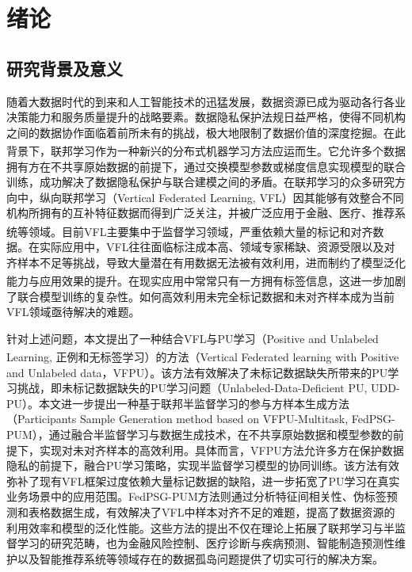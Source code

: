 \chapter{绪论} 
\thispagestyle{others} 
\pagestyle{others} 
\xiaosi 

\section{研究背景及意义}
随着大数据时代的到来和人工智能技术的迅猛发展，数据资源已成为驱动各行各业决策能力和服务质量提升的战略要素。数据隐私保护法规日益严格，使得不同机构之间的数据协作面临着前所未有的挑战，极大地限制了数据价值的深度挖掘。在此背景下，联邦学习\textsuperscript{\cite{chen2021secureboost+,de2010practical}}作为一种新兴的分布式机器学习方法应运而生。它允许多个数据拥有方在不共享原始数据的前提下，通过交换模型参数或梯度信息实现模型的联合训练，成功解决了数据隐私保护与联合建模之间的矛盾。在联邦学习的众多研究方向中，纵向联邦学习（Vertical Federated Learning, VFL）因其能够有效整合不同机构所拥有的互补特征数据而得到广泛关注，并被广泛应用于金融、医疗、推荐系统等领域\textsuperscript{\cite{liu2020secure,chen2020vafl}}。目前VFL主要集中于监督学习领域，严重依赖大量的标记和对齐数据。在实际应用中，VFL往往面临标注成本高、领域专家稀缺、资源受限以及对齐样本不足等挑战，导致大量潜在有用数据无法被有效利用，进而制约了模型泛化能力与应用效果的提升\textsuperscript{\cite{li2021comatch}}。在现实应用中常常只有一方拥有标签信息，这进一步加剧了联合模型训练的复杂性。如何高效利用未完全标记数据和未对齐样本成为当前VFL领域亟待解决的难题。

针对上述问题，本文提出了一种结合VFL与PU学习（Positive and Unlabeled Learning, 正例和无标签学习）\textsuperscript{\cite{pulearn}}的方法（Vertical Federated learning with Positive and Unlabeled data，VFPU）。该方法有效解决了未标记数据缺失所带来的PU学习挑战，即未标记数据缺失的PU学习问题（Unlabeled-Data-Deficient PU, UDD-PU）。本文进一步提出一种基于联邦半监督学习的参与方样本生成方法（Participants Sample Generation method based on VFPU-Multitask, FedPSG-PUM），通过融合半监督学习与数据生成技术，在不共享原始数据和模型参数的前提下，实现对未对齐样本的高效利用。具体而言，VFPU方法允许多方在保护数据隐私的前提下，融合PU学习策略，实现半监督学习模型的协同训练。该方法有效弥补了现有VFL框架过度依赖大量标记数据的缺陷，进一步拓宽了PU学习在真实业务场景中的应用范围。FedPSG-PUM方法则通过分析特征间相关性、伪标签预测和表格数据生成，有效解决了VFL中样本对齐不足的难题，提高了数据资源的利用效率和模型的泛化性能。这些方法的提出不仅在理论上拓展了联邦学习与半监督学习的研究范畴，也为金融风险控制、医疗诊断与疾病预测、智能制造预测性维护以及智能推荐系统等领域存在的数据孤岛问题提供了切实可行的解决方案。


